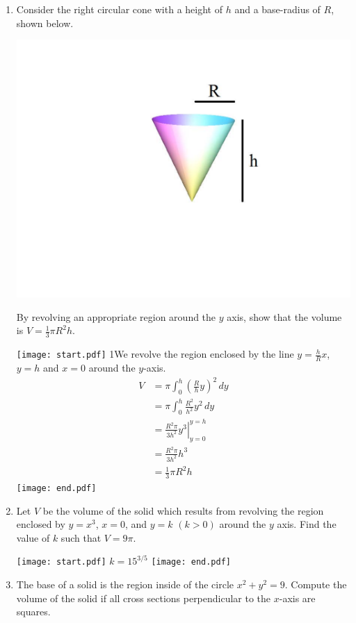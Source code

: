 \documentclass[12pt]{article}
\begin{document}
\begin{enumerate}
\item Consider the right circular cone with a height of $h$ and a base-radius of $R$, shown below.
\begin{center}
\includegraphics[scale=0.30]{cone.pdf}
\end{center}
By revolving an appropriate region around the $y$ axis, show that the volume is $V=\frac{1}{3}\pi R^2h$.

\texttt{[image: start.pdf]}
{{{1\linewidth}{We revolve the region enclosed by the line $y=\frac{h}{R}x$, $y=h$ and $x=0$ around the $y$-axis.
\begin{align*}
V&=\pi\int_0^h \left(\frac{R}{h}y\right)^2 \,dy\\
&=\pi\int_0^h \frac{R^2}{h^2}y^2 \,dy\\
&=\left.\frac{R^2\pi}{3h^2}y^3\right|_{y=0}^{y=h}\\
&=\frac{R^2\pi}{3h^2}h^3\\
&=\frac{1}{3}\pi R^2h
\end{align*}
}}}
\texttt{[image: end.pdf]}


\item Let $V$ be the volume of the solid which results from revolving the region enclosed by $y=x^3$, $x=0$, and $y=k$ $(k>0)$ around the $y$ axis.  Find the value of $k$ such that $V=9\pi$.

\texttt{[image: start.pdf]}
{{$k=15^{3/5}$}}
\texttt{[image: end.pdf]}


\item The base of a solid is the region inside of the circle $x^2+y^2=9$.  Compute the volume of the solid if all cross sections perpendicular to the $x$-axis are squares.


\end{enumerate}
\end{document}
